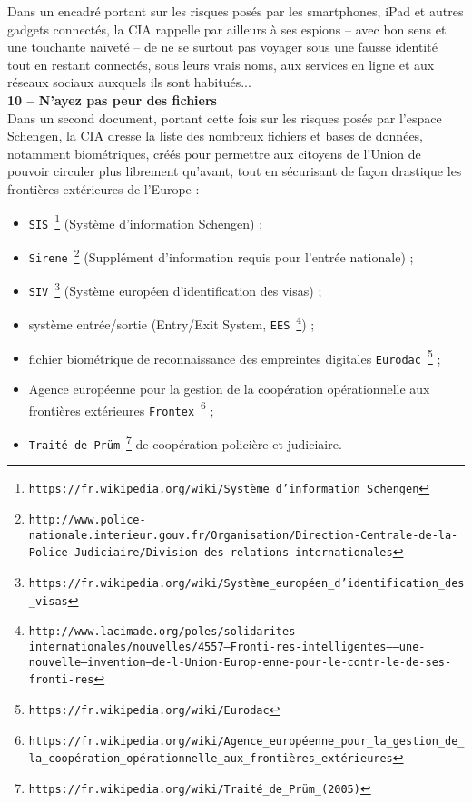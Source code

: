 \documentclass[11pt,twoside,a4paper]{article}
\begin{document}
Dans un encadr{\'e} portant sur les risques pos{\'e}s par les smartphones, iPad et autres gadgets connect{\'e}s, la CIA rappelle par ailleurs {\`a} ses espions -- avec bon sens et une touchante na{\"i}vet{\'e} -- de ne se surtout pas voyager sous une fausse identit{\'e} tout en restant connect{\'e}s, sous leurs vrais noms, aux services en ligne et aux r{\'e}seaux sociaux auxquels ils sont habitu{\'e}s... ~\\

\textbf{\large 10 -- N'ayez pas peur des fichiers}~\\


Dans un second document, portant cette fois sur les risques pos{\'e}s par l'espace Schengen, la CIA dresse la liste des nombreux fichiers et bases de donn{\'e}es, notamment biom{\'e}triques, cr{\'e}{\'e}s pour permettre aux citoyens de l'Union de pouvoir circuler plus librement qu'avant, tout en s{\'e}curisant de fa\c{c}on drastique les fronti{\`e}res ext{\'e}rieures de l'Europe :
\begin{itemize}
	\item \texttt{SIS}~\footnote{\texttt{https://fr.wikipedia.org/wiki/Syst{\`e}me\_d'information\_Schengen}} (Syst{\`e}me d'information Schengen) ;
	\item \texttt{Sirene}~\footnote{\texttt{http://www.police-nationale.interieur.gouv.fr/Organisation/Direction-Centrale-de-la-Police-Judiciaire/Division-des-relations-internationales}} (Suppl{\'e}ment d'information requis pour l'entr{\'e}e nationale) ;
	\item \texttt{SIV}~\footnote{\texttt{https://fr.wikipedia.org/wiki/Syst{\`e}me\_europ{\'e}en\_d'identification\_des\_visas}} (Syst{\`e}me europ{\'e}en d'identification des visas) ;
	\item syst{\`e}me entr{\'e}e/sortie (Entry/Exit System, \texttt{EES}~\footnote{\texttt{http://www.lacimade.org/poles/solidarites-internationales/nouvelles/4557---Fronti-res-intelligentes-----une-nouvelle---invention---de-l-Union-Europ-enne-pour-le-contr-le-de-ses-fronti-res}}) ;
	\item fichier biom{\'e}trique de reconnaissance des empreintes digitales \texttt{Eurodac}~\footnote{\texttt{https://fr.wikipedia.org/wiki/Eurodac}} ;
	\item Agence europ{\'e}enne pour la gestion de la coop{\'e}ration op{\'e}rationnelle aux fronti{\`e}res ext{\'e}rieures \texttt{Frontex}~\footnote{\texttt{https://fr.wikipedia.org/wiki/Agence\_europ{\'e}enne\_pour\_la\_gestion\_de\_la\_coop{\'e}ration\_op{\'e}rationnelle\_aux\_fronti{\`e}res\_ext{\'e}rieures}} ;
	\item \texttt{Trait{\'e} de Pr{\"u}m}~\footnote{\texttt{https://fr.wikipedia.org/wiki/Trait{\'e}\_de\_Pr{\"u}m\_(2005)}} de coop{\'e}ration polici{\`e}re et judiciaire.
\end{itemize}
\end{document}
